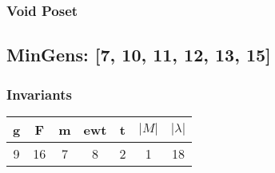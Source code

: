 \documentclass[a4paper]{article}
\begin{document}
\hfill\begin{minipage}{0.48\textwidth}
\subsubsection*{Void Poset}
\centering
{}
\end{minipage}
\newpage\subsection{MinGens: [7, 10, 11, 12, 13, 15]}
\noindent\begin{minipage}{0.6\textwidth}
\subsubsection*{Invariants}
\centering
\begin{tabular}{|c|c|c|c|c|c|c|}
\toprule
g & F & m & ewt & t & \(|M|\) & \(|\lambda|\) \\
\midrule
9 & 16 & 7 & 8 & 2 & 1 & 18 \\
\bottomrule
\end{tabular}
\end{minipage}%
\end{document}
